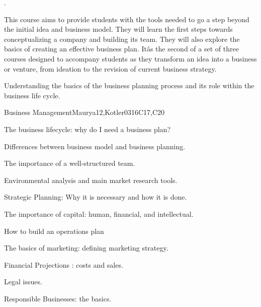 \begin{syllabus}


\begin{justification}
.
\end{justification}
This course aims to provide students with the tools needed to go a step beyond the initial idea and business model. They will learn the first steps towards conceptualizing a company and building its team. They will also explore the basics of creating an effective business plan. Itâs the second of a set of three courses
designed to accompany students as they transform an idea into a business or venture, from ideation to the revision of current business strategy.
\begin{goals}
\item Understanding the basics of the business planning process and its role within the business life cycle.
\end{goals}

\begin{outcomes}
   \item {}
   \item {}
   \item {}
\end{outcomes}

\begin{competences}
    \item {}
    \item {}
    \item {}
\end{competences}

\begin{unit}{Business Management}{}{Maurya12,Kotler03}{16}{C17,C20}
\begin{topics}
      \item The business lifecycle: why do I need a business plan?
      \item Differences between business model and business planning.
      \item The importance of a well-structured team.
      \item Environmental analysis and main market research tools.
      \item Strategic Planning: Why it is necessary and how it is done.
      \item The importance of capital: human, financial, and intellectual.
      \item How to build an operations plan
      \item The basics of marketing: defining marketing strategy.
      \item Financial Projections : costs and sales.
      \item Legal issues.
      \item Responsible Businesses: the basics.
\end{topics}


\end{unit}
\end{syllabus}

